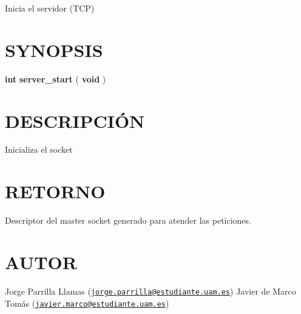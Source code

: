 Inicia el servidor (T\+C\+P)\hypertarget{Conexi_xC3_xB3n_SYNOPSIS}{}\section{S\+Y\+N\+O\+P\+S\+I\+S}\label{Conexi_xC3_xB3n_SYNOPSIS}
{\bfseries int} {\bfseries server\+\_\+start} {\bfseries }( {\bfseries void} )\hypertarget{Conexi_xC3_xB3n_descripcion}{}\section{D\+E\+S\+C\+R\+I\+P\+C\+IÓ\+N}\label{Conexi_xC3_xB3n_descripcion}
Inicializa el socket\hypertarget{Conexi_xC3_xB3n_retorno}{}\section{R\+E\+T\+O\+R\+N\+O}\label{Conexi_xC3_xB3n_retorno}
Descriptor del master socket generado para atender las peticiones.\hypertarget{Conexi_xC3_xB3n_authors}{}\section{A\+U\+T\+O\+R}\label{Conexi_xC3_xB3n_authors}
Jorge Parrilla Llamas (\href{mailto:jorge.parrilla@estudiante.uam.es}{\tt jorge.\+parrilla@estudiante.\+uam.\+es}) Javier de Marco Tomás (\href{mailto:javier.marco@estudiante.uam.es}{\tt javier.\+marco@estudiante.\+uam.\+es}) 